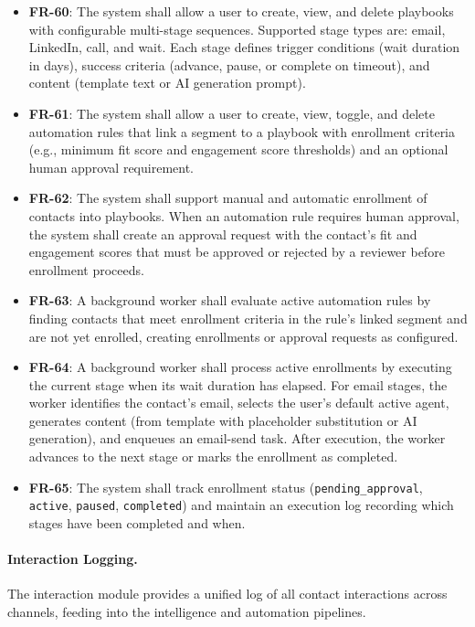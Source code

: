 \begin{itemize}
    \item \textbf{FR-60}: The system shall allow a user to create, view, and delete playbooks with configurable multi-stage sequences. Supported stage types are: email, LinkedIn, call, and wait. Each stage defines trigger conditions (wait duration in days), success criteria (advance, pause, or complete on timeout), and content (template text or AI generation prompt).
    \item \textbf{FR-61}: The system shall allow a user to create, view, toggle, and delete automation rules that link a segment to a playbook with enrollment criteria (e.g., minimum fit score and engagement score thresholds) and an optional human approval requirement.
    \item \textbf{FR-62}: The system shall support manual and automatic enrollment of contacts into playbooks. When an automation rule requires human approval, the system shall create an approval request with the contact's fit and engagement scores that must be approved or rejected by a reviewer before enrollment proceeds.
    \item \textbf{FR-63}: A background worker shall evaluate active automation rules by finding contacts that meet enrollment criteria in the rule's linked segment and are not yet enrolled, creating enrollments or approval requests as configured.
    \item \textbf{FR-64}: A background worker shall process active enrollments by executing the current stage when its wait duration has elapsed. For email stages, the worker identifies the contact's email, selects the user's default active agent, generates content (from template with placeholder substitution or AI generation), and enqueues an email-send task. After execution, the worker advances to the next stage or marks the enrollment as completed.
    \item \textbf{FR-65}: The system shall track enrollment status (\texttt{pending\_approval}, \texttt{active}, \texttt{paused}, \texttt{completed}) and maintain an execution log recording which stages have been completed and when.
\end{itemize}

\paragraph{Interaction Logging.}
The interaction module provides a unified log of all contact interactions across channels, feeding into the intelligence and automation pipelines.

